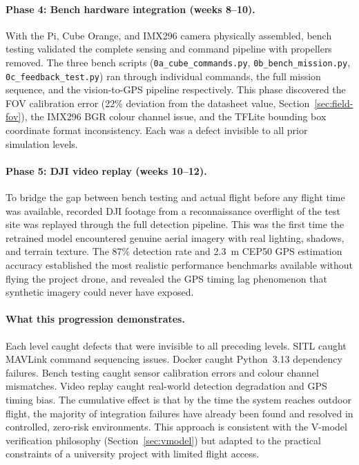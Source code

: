 \paragraph{Phase 4: Bench hardware integration (weeks 8--10).}
With the Pi, Cube Orange, and IMX296 camera physically assembled, bench testing validated the complete sensing and command pipeline with propellers removed.  The three bench scripts (\texttt{0a\_cube\_commands.py}, \texttt{0b\_bench\_mission.py}, \texttt{0c\_feedback\_test.py}) ran through individual commands, the full mission sequence, and the vision-to-GPS pipeline respectively.  This phase discovered the FOV calibration error (22\% deviation from the datasheet value, Section~\ref{sec:field-fov}), the IMX296 BGR colour channel issue, and the TFLite bounding box coordinate format inconsistency.  Each was a defect invisible to all prior simulation levels.

\paragraph{Phase 5: DJI video replay (weeks 10--12).}
To bridge the gap between bench testing and actual flight before any flight time was available, recorded DJI footage from a reconnaissance overflight of the test site was replayed through the full detection pipeline.  This was the first time the retrained model encountered genuine aerial imagery with real lighting, shadows, and terrain texture.  The 87\% detection rate and 2.3~m CEP50 GPS estimation accuracy established the most realistic performance benchmarks available without flying the project drone, and revealed the GPS timing lag phenomenon that synthetic imagery could never have exposed.

\paragraph{What this progression demonstrates.}
Each level caught defects that were invisible to all preceding levels.  SITL caught MAVLink command sequencing issues.  Docker caught Python~3.13 dependency failures.  Bench testing caught sensor calibration errors and colour channel mismatches.  Video replay caught real-world detection degradation and GPS timing bias.  The cumulative effect is that by the time the system reaches outdoor flight, the majority of integration failures have already been found and resolved in controlled, zero-risk environments.  This approach is consistent with the V-model verification philosophy (Section~\ref{sec:vmodel}) but adapted to the practical constraints of a university project with limited flight access.

